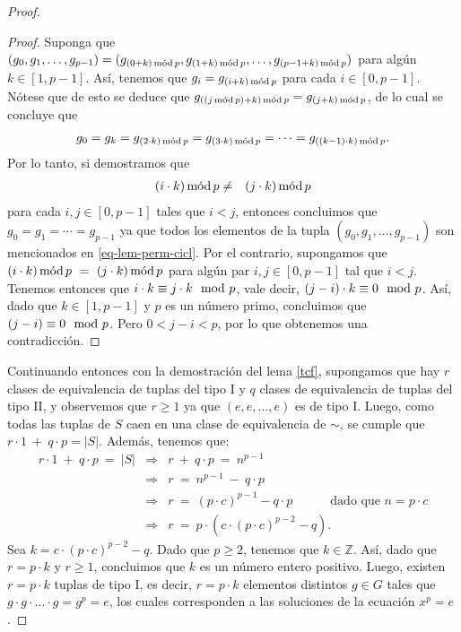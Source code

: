 \begin{proof}
\begin{proof}
Suponga que $(g_0, g_1, \ldots, g_{p-1}) = (g_{(0+k) \mods p},
g_{(1+k) \mods p}, \ldots, g_{(p-1+k) \mods p})$ para algún $k \in
[1,p-1]$. Así, tenemos que $g_i = g_{(i+k) \mods p}$ para cada
$i \in [0,p-1]$. Nótese que de esto se deduce que $g_{((j\mods p) +k)\mods p} = g_{(j+k)\mods p}$, de lo cual se concluye que
\begin{align}\label{eq-lem-perm-cicl}
g_0 = g_k = g_{(2\cdot k) \mods p} = g_{(3\cdot k) \mods p} = \cdots = g_{((k-1) \cdot k) \mods p}.
\end{align}
Por lo tanto, si demostramos que
\begin{eqnarray*}
(i \cdot k) \mods p & \neq & (j \cdot k) \mods p
\end{eqnarray*}
para cada $i,j \in [0,p-1]$ tales que $i < j$, entonces concluimos que
$g_0 = g_1 = \cdots = g_{p-1}$ ya que todos los elementos de la tupla
$(g_0, g_1, \ldots, g_{p-1})$ son mencionados
en \eqref{eq-lem-perm-cicl}. Por el contrario, supongamos que $(i \cdot
k) \mods p \ = \ (j \cdot k) \mods p$ para algún par $i,j \in [0,p-1]$ tal
que $i < j$. Tenemos entonces que $i \cdot k \equiv j \cdot k \modl
p$, vale decir, $(j-i) \cdot k \equiv 0 \modl p$. Así, dado que $k \in
[1,p-1]$ y $p$ es un número primo, concluimos que $(j-i) \equiv
0 \modl p$. Pero $0 < j-i < p$, por lo que obtenemos una
contradicción.
\end{proof}

Continuando entonces con la demostración del lema \ref{tcf},
supongamos que hay $r$ clases de equivalencia de tuplas del tipo I y
$q$ clases de equivalencia de tuplas del tipo II, y observemos que
$r\geq 1$ ya que $(e,e,\ldots,e)$ es de tipo I. Luego, como todas las
tuplas de $S$ caen en una clase de equivalencia de $\sim$, se cumple
que $r\cdot 1 \ + \ q\cdot p = |S|$. Además, tenemos que:
\begin{eqnarray*}
r\cdot 1 \ + \ q\cdot p \ = \ |S| &\Rightarrow&  r \ + \ q\cdot p \ = \ n^{p-1}\\ 
	&\Rightarrow& r \ = \ n^{p-1} \ - \ q\cdot p\\
	&\Rightarrow& r \ = \ (p \cdot c)^{p-1} - q \cdot p \quad\quad\quad \text{dado que } n= p\cdot c\\
	&\Rightarrow& r \ = \ p\cdot (c\cdot (p \cdot c)^{p-2}-q).
\end{eqnarray*}
Sea $k = c\cdot (p \cdot c)^{p-2}-q$. Dado que $p\geq 2$, tenemos que
$k \in \mathbb{Z}$. Así, dado que $r = p \cdot k$ y $r \geq 1$,
concluimos que $k$ es un número entero positivo.
Luego, existen $r = p\cdot k$ tuplas de tipo I,
es decir, $r=p\cdot k$ elementos distintos $g\in G$ tales que $g \cdot
g \cdot \ldots \cdot g = g^p = e$, los cuales corresponden a las
soluciones de la ecuación $x^p=e$.
\end{proof}
